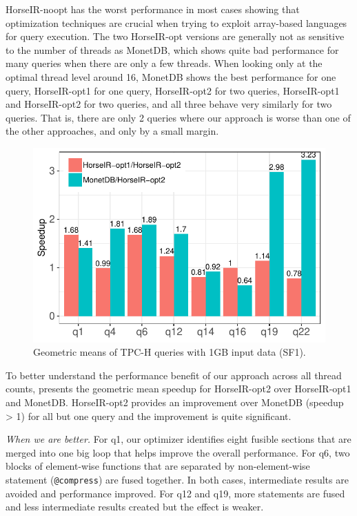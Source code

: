 HorseIR-noopt has the worst performance in most cases showing that optimization
techniques are crucial when trying to exploit array-based languages for query
execution. The two HorseIR-opt versions are generally not as sensitive to the
number of threads as MonetDB, which shows quite bad performance for many
queries when there are only a few threads. 
When looking only at the optimal thread level around 16, MonetDB shows the best
performance for one query, HorseIR-opt1 for one query, HorseIR-opt2 for two
queries, HorseIR-opt1 and HorseIR-opt2 for two queries, and all three behave
very similarly for two queries. That is, there are only 2 queries where our
approach is worse than one of the other approaches, and only by a small margin.

\begin{figure}[htbp]
\centering
\includegraphics[width=.9\columnwidth]{./src/figure/sf1-speedup.pdf}
\caption{Geometric means of TPC-H queries with 1GB input data (SF1).}
\label{fig:tpch_sf1_speedup}
\end{figure}

To better understand the performance benefit of our approach across all thread counts, 
 presents the geometric mean speedup for HorseIR-opt2
over HorseIR-opt1 and MonetDB. HorseIR-opt2 provides an improvement over
MonetDB (speedup > 1) for all but one query and the improvement is quite significant. 

\textit{When we are better.}
For q1, our optimizer identifies eight fusible sections that are
merged into one big loop that helps improve the overall performance.
For q6, two blocks of element-wise functions that are separated by
non-element-wise statement (\texttt{@compress}) are fused together. In
both cases, intermediate results are avoided and performance improved.
For q12 and q19, more statements are fused and less intermediate results
created but the effect is weaker.

